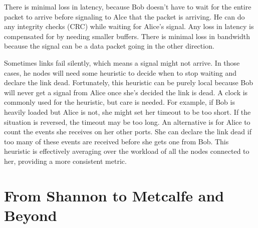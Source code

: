 \documentclass[../HFT-main.tex]{subfiles}
\begin{document}
There is minimal loss in latency, because Bob doesn't have to wait for the entire packet to arrive before signaling to Alce that the packet is arriving.  He can do any integrity checks (CRC) while waiting for Alice's signal.  Any loss in latency is compensated for by needing smaller buffers.  There is minimal loss in bandwidth because the signal can be a data packet going in the other direction.

Sometimes links fail silently, which means a signal might not arrive.  In those cases, he nodes will need some heuristic to decide when to stop waiting and declare the link dead.  Fortunately, this heuristic can be purely local because Bob will never get a signal from Alice once she's decided the link is dead.  A clock is commonly used for the heuristic, but care is needed.  For example, if Bob is heavily loaded but Alice is not, she might set her timeout to be too short.  If the situation is reversed, the timeout may be too long.  An alternative is for Alice to count the events she receives on her other ports.  She can declare the link dead if too many of these events are received before she gets one from Bob.  This heuristic is effectively averaging over the workload of all the nodes connected to her, providing a more consistent metric.


%
%
%
%
%
%
%
%
%
%
%
%
%
%

\newpage
\section{From Shannon to Metcalfe and Beyond}
\end{document}
